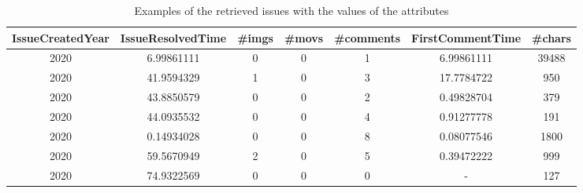 \begin{table*}[h]
    \begin{center}
    \caption{Examples of the retrieved issues with the values of the attributes}
    \begin{tabular}{c c c c c c c} 
      \toprule
      \textbf{IssueCreatedYear} &
      \textbf{IssueResolvedTime} &
      \textbf{\#imgs} &
      \textbf{\#movs} &
      \textbf{\#comments} &
      \textbf{FirstCommentTime} &
      \textbf{\#chars} \\
      \midrule
      2020 & 6.99861111 & 0 & 0 & 1 & 6.99861111 & 39488\\
      2020 & 41.9594329 & 1 & 0 & 3 & 17.7784722 & 950\\
      2020 & 43.8850579 & 0 & 0 & 2 & 0.49828704 & 379\\
      2020 & 44.0935532 & 0 & 0 & 4 & 0.91277778 & 191\\
      2020 & 0.14934028 & 0 & 0 & 8 & 0.08077546 & 1800\\
      2020 & 59.5670949 & 2 & 0 & 5 & 0.39472222 & 999\\
      2020 & 74.9322569 & 0 & 0 & 0 & -          & 127\\
      \bottomrule
    \end{tabular}
    \label{tab:example-dataset}
    \end{center}
  \end{table*}
